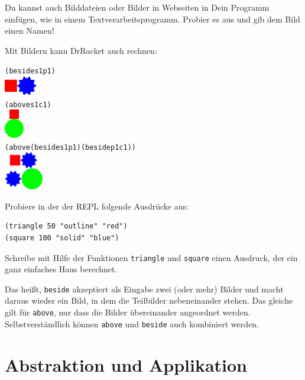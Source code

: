 %
\begin{aufgabeinline}
  Du kannst auch Bilddateien oder Bilder in Webseiten in Dein Programm
  einfügen, wie in einem Textverarbeitsprogramm.  Probier es aus und
  gib dem Bild einen Namen!
\end{aufgabeinline}
%
Mit Bildern kann DrRacket auch rechnen:
%
\begin{alltt}
(beside s1 p1)
\evalsto{} \includegraphics[height=24pt]{i1prog/beside.png}
(above s1 c1)
\evalsto{} \includegraphics[width=24pt]{i1prog/above.png}
(above (beside s1 p1) (beside p1 c1))
\evalsto{} \includegraphics[width=48pt]{i1prog/abovebeside.png}
\end{alltt}
%
\begin{aufgabeinline}
  Probiere in der der REPL folgende Ausdrücke aus:
\begin{verbatim}
(triangle 50 "outline" "red")
(square 100 "solid" "blue")
\end{verbatim}
  Schreibe mit Hilfe der Funktionen \texttt{triangle} und
  \texttt{square} einen Ausdruck, der ein ganz einfaches Haus
  berechnet.
\end{aufgabeinline}
%
Das heißt, \texttt{beside} akzeptiert als Eingabe zwei (oder mehr)
Bilder und macht daraus wieder ein Bild, in dem die Teilbilder
nebeneinander stehen.  Das gleiche gilt für \texttt{above}, nur dass
die Bilder übereinander angeordnet werden.  Selbstverständlich können
\texttt{above} und \texttt{beside} auch kombiniert werden.

\section{Abstraktion und Applikation}
\label{sec:abstraktion-und-applikation}

